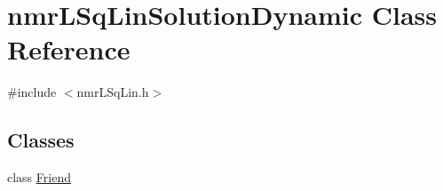 \hypertarget{classnmr_l_sq_lin_solution_dynamic}{}\section{nmr\+L\+Sq\+Lin\+Solution\+Dynamic Class Reference}
\label{classnmr_l_sq_lin_solution_dynamic}


{\ttfamily \#include $<$nmr\+L\+Sq\+Lin.\+h$>$}

\subsection*{Classes}
\begin{DoxyCompactItemize}
\item 
class \hyperlink{classnmr_l_sq_lin_solution_dynamic_1_1_friend}{Friend}
\end{DoxyCompactItemize}
